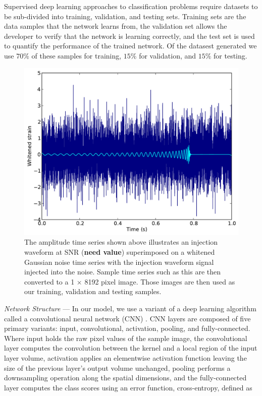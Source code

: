 \documentclass[%
 amsmath,amssymb,
 aps,
 twocolumn,
 prl,
 reprint,
floatfix,
]{revtex4-1}
\begin{document}
%
%
Supervised deep learning approaches to classification problems require
datasets to be sub-divided into training, validation, and testing sets.
Training sets are the data samples that the network learns from, the validation
set allows the developer to verify that the network is learning correctly, and
the test set is used to quantify the performance of the trained network.  
Of the datasest generated we use $70\%$ of these samples for training,
$15\%$ for validation, and $15\%$ for testing.

\begin{figure} 
\includegraphics[width=\columnwidth]{figures/waveform.pdf}
\caption{\label{fig:waveform} The amplitude time series shown above illustrates
an injection waveform at SNR (\textbf{need value}) superimposed on a whitened
Gaussian noise time series with the injection waveform signal injected into the
noise. Sample time series such as this are then converted to a 1 $\times$ 8192
pixel image. Those images are then used as our training, validation and testing
samples.}
\end{figure}

%
% 
\textit{Network Structure} --- 
%
%
%
In our model, we use a variant of a deep learning algorithm called a
convolutional neural network (CNN) \cite{726791}.  CNN layers are composed of
five primary variants: input, convolutional, activation, pooling, and
fully-connected. Where input holds the raw pixel values of the sample image,
the convolutional layer computes the convolution between the kernel and a local
region of the input layer volume, activation applies an elementwise activation
function leaving the size of the previous layer's output volume unchanged,
pooling performs a downsampling operation along the spatial dimensions, and the
fully-connected layer computes the class scores using an error function,
cross-entropy, defined as
\end{document}
